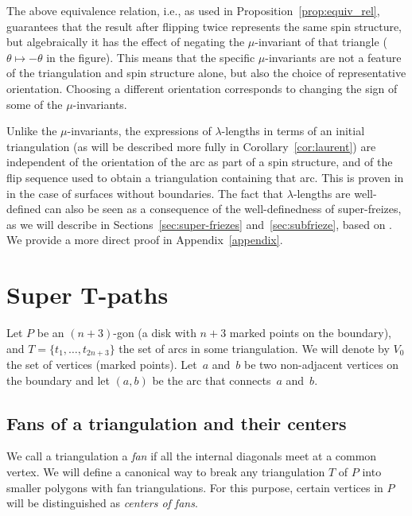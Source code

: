 \documentclass[11pt]{article}
\numberwithin{equation}{section}
\numberwithin{equation}{section}
\begin{document}
\begin{Remark} \label{rem:mu-invariants}\rm
The above equivalence relation, i.e., as used in Proposition~\ref{prop:equiv_rel}, guarantees that the result after flipping twice represents the same spin structure, but algebraically it has the effect of negating the $\mu$-invariant of that triangle
($\theta \mapsto -\theta$ in the figure). This means that the specific $\mu$-invariants are not a feature of the triangulation
and spin structure alone, but also the choice of representative orientation. Choosing a different orientation corresponds to
changing the sign of some of the $\mu$-invariants.
\end{Remark}

\begin{Remark} \label{rem:lambda}\rm
Unlike the $\mu$-invariants, the expressions of $\lambda$-lengths in terms of an initial triangulation (as will be described more fully in Corollary~\ref{cor:laurent}) are independent of the orientation of the arc as part of a spin structure, and of the flip sequence used to obtain a triangulation containing that arc. This is proven in \cite{pz_19} in the case of surfaces without boundaries. The fact that $\lambda$-lengths are well-defined can also be seen as a consequence of the well-definedness of super-freizes, as we will describe in Sections~\ref{sec:super-friezes} and~\ref{sec:subfrieze}, based on \cite{M-GOT15,pz_19}. We provide a more direct proof in Appendix~\ref{appendix}.
\end{Remark}

\section[Super T-paths]{Super $\boldsymbol{T}$-paths}
Let $P$ be an $(n+3)$-gon (a disk with $n+3$ marked points on the boundary), and $T = \{t_1,\dots,t_{2n+3}\}$ the set of arcs in some triangulation.
We will denote by $V_0$ the set of vertices (marked points).
Let~$a$ and~$b$ be two non-adjacent vertices on the boundary and let $(a,b)$ be the arc that connects~$a$ and~$b$.

\subsection{Fans of a triangulation and their centers}

We call a triangulation a \emph{fan} if all the internal diagonals meet at a common vertex.
We will define a canonical way to break any triangulation $T$ of $P$ into smaller polygons with fan triangulations.
For this purpose, certain vertices in $P$ will be distinguished as \emph{centers of fans}.
\end{document}
